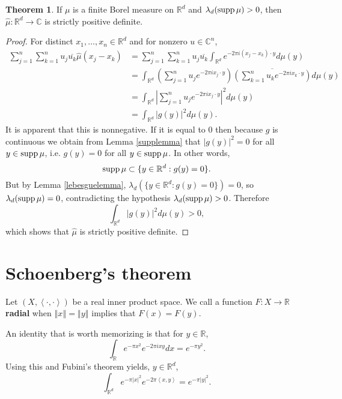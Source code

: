 \documentclass{article}
\newcommand{\inner}[2]{\left\langle #1, #2 \right\rangle}
\newcommand{\supp}{\ensuremath\mathrm{supp}\,}
\newcommand{\norm}[1]{\left\Vert #1 \right\Vert}
\theoremstyle{definition}
\newtheorem{theorem}{Theorem}
\theoremstyle{definition}
\begin{document}
\begin{theorem}
If $\mu$ is a finite Borel measure on $\mathbb{R}^d$ and $\lambda_d(\supp \mu)>0$, then 
$\hat{\mu}:\mathbb{R}^d \to \mathbb{C}$ is strictly positive definite.
\label{fourier}
\end{theorem} 
\begin{proof}
For distinct $x_1,\ldots,x_n \in \mathbb{R}^d$ and for nonzero $u \in \mathbb{C}^n$, 
\begin{align*}
\sum_{j=1}^n \sum_{k=1}^n u_j \overline{u_k} \hat{\mu}(x_j-x_k)&=
\sum_{j=1}^n \sum_{k=1}^n u_j \overline{u_k} \int_{\mathbb{R}^d} e^{-2\pi i(x_j-x_k)\cdot y} d\mu(y)\\
&=\int_{\mathbb{R}^d} \left(\sum_{j=1}^n u_j e^{-2\pi ix_j\cdot y} \right) \overline{\left( \sum_{k=1}^n u_k e^{-2\pi ix_k\cdot y} \right)} d\mu(y)\\
&=\int_{\mathbb{R}^d} \left| \sum_{j=1}^n u_j e^{-2\pi ix_j\cdot y} \right|^2 d\mu(y)\\
&=\int_{\mathbb{R}^d} |g(y)|^2 d\mu(y).
\end{align*}
It is apparent that this is nonnegative. If it is equal to $0$ then because $g$ is continuous we obtain from Lemma \ref{supplemma}
that 
$|g(y)|^2=0$ for all $y \in \supp \mu$, i.e.
$g(y)=0$ for all $y \in \supp \mu$. In other words,
\[
\supp \mu \subset \{y \in \mathbb{R}^d: g(y)=0\}.
\]
But by Lemma \ref{lebesguelemma}, $\lambda_d(\{y \in \mathbb{R}^d: g(y)=0\})=0$, so $\lambda_d(\supp \mu)=0$,
contradicting the hypothesis $\lambda_d(\supp \mu)>0$. Therefore
\[
\int_{\mathbb{R}^d} |g(y)|^2 d\mu(y)>0,
\]
which shows that $\hat{\mu}$ is strictly positive definite.
\end{proof}


\section{Schoenberg's  theorem}
Let $(X,\inner{\cdot}{\cdot})$ be a real  inner product space. We call a function $F:X \to \mathbb{R}$ \textbf{radial} when 
$\norm{x}=\norm{y}$ implies that $F(x)=F(y)$. 


An identity that is worth memorizing is that for $y \in \mathbb{R}$,
\[
\int_{\mathbb{R}} e^{-\pi x^2} e^{-2\pi ixy} dx = e^{-\pi y^2}.
\]
Using this and Fubini's theorem yields,
 $y \in \mathbb{R}^d$,
\[
\int_{\mathbb{R}^d} e^{-\pi |x|^2} e^{-2\pi \inner{x}{y}} = e^{-\pi |y|^2}.
\]
\end{document}
